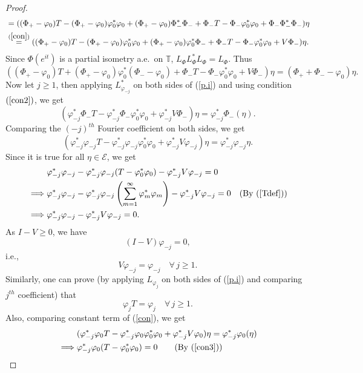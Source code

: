 \documentclass[12pt]{amsart}
\newcommand{\cle}{\mathcal{E}}
\newcommand{\T}{\mathbb{T}}
\theoremstyle{definition}
\theoremstyle{plain}
\theoremstyle{definition}
\numberwithin{equation}{section}
\let\phi=\varphi
\begin{document}
\begin{proof}
\begin{align*}
 &=((\Phi_+-\phi_0)T-(\Phi_+-\phi_0)\phi^*_0\phi_0+(\Phi_+-\phi_0)\Phi_-^*\Phi_-+\Phi_-T-\Phi_-\phi_0^*\phi_0+\Phi_-\Phi_-^*\Phi_-)\eta\\
 &\stackrel{(\ref{con})}{=} ((\Phi_+-\phi_0)T-(\Phi_+-\phi_0)\phi_0^*\phi_0+(\Phi_+-\phi_0)\phi_0^*\Phi_-+\Phi_-T-\Phi_-\phi_0^*\phi_0+V\Phi_-)\eta. 
\end{align*}
Since $\Phi(e^{it})$ is a partial isometry a.e.\ on $\T$, $L_\Phi L_\Phi^*L_\Phi=L_\Phi$. Thus
\begin{equation}\label{p.i}
((\Phi_+-\phi_0)T+(\Phi_+-\phi_0)\phi_0^*(\Phi_--\phi_0)+\Phi_-T-\Phi_-\phi_0^*\phi_0+V\Phi_-)\eta=(\Phi_++\Phi_--\phi_0)\eta.
\end{equation}
Now let $j \geq 1$, then applying $L_{\phi_{-j}}^*$ on both sides of (\ref{p.i}) and using condition $(\ref{con2})$, we get
\begin{equation}\label{con}
(\phi_{-j}^*\Phi_-T-\phi_{-j}^*\Phi_-\phi_0^*\phi_0+\phi_{-j}^*V\Phi_-)\eta =\phi_{-j}^*\Phi_-(\eta).
\end{equation}
Comparing the $(-j)^{th}$ Fourier coefficient on both sides, we get
\[
(\phi_{-j}^*\phi_{-j}T-\phi_{-j}^*\phi_{-j}\phi_0^*\phi_0+\phi_{-j}^*V\phi_{-j})\eta=\phi_{-j}^*\phi_{-j}\eta.
\]
Since it is true for all $\eta \in \cle$, we get
\begin{align*}
&\phi_{-j}^*\phi_{-j}-\phi_{-j}^*\phi_{-j}(T-\phi_0^*\phi_0)-\phi_{-j}^*V\phi_{-j}=0\\
\implies&\phi_{-j}^*\phi_{-j}-\phi_{-j}^*\phi_{-j}\left(\sum\limits_{m=1}^\infty \phi_m^*\phi_m\right)-\phi_{-j}^*V\phi_{-j}=0 \quad \text{(By (\ref{Tdef}))}\\ 
\implies & \phi_{-j}^*\phi_{-j}-\phi_{-j}^*V\phi_{-j}=0.
\end{align*}
As $I-V\geq 0$, we have
\[
(I -V)\phi_{-j}=0, 
\]
i.e.,
\begin{equation} \label{con3}
V\phi_{-j}=\phi_{-j} \quad \forall \,j \geq 1.
\end{equation}
Similarly, one can prove (by applying $L_{\phi_j}$ on both sides of (\ref{p.i})  and comparing $j^{th}$ coefficient) that
\begin{equation}\label{con4}
\phi_jT=\phi_j \quad \forall \, j \geq 1.
\end{equation}
Also, comparing constant term of (\ref{con}), we get
\begin{align*}
&(\phi_{-j}^*\phi_0T-\phi_{-j}^*\phi_0\phi_0^*\phi_0+\phi_{-j}^*V\phi_0)\eta=\phi_{-j}^*\phi_0(\eta)\\
\implies 	&\phi_{-j}^*\phi_0(T-\phi_0^*\phi_0)=0 \quad \quad (\text{By (\ref{con3})})\\

\end{align*}
\end{proof}
\end{document}

